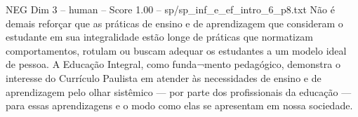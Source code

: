 \begin{textsample}{NEG Dim 3 – human – Score 1.00 – sp/sp\_inf\_e\_ef\_intro\_6\_p8.txt}  \label{ex:f3_neg_003}
Não é demais reforçar que as práticas de ensino e de aprendizagem que consideram o estudante em sua integralidade estão longe de práticas que normatizam comportamentos, rotulam ou buscam adequar os estudantes a um modelo ideal de pessoa.
A Educação Integral, como funda¬mento pedagógico, demonstra o interesse do Currículo Paulista em atender às necessidades de ensino e de aprendizagem pelo olhar sistêmico — por parte dos profissionais da educação — para essas aprendizagens e o modo como elas se apresentam em nossa sociedade.

\end{textsample}
